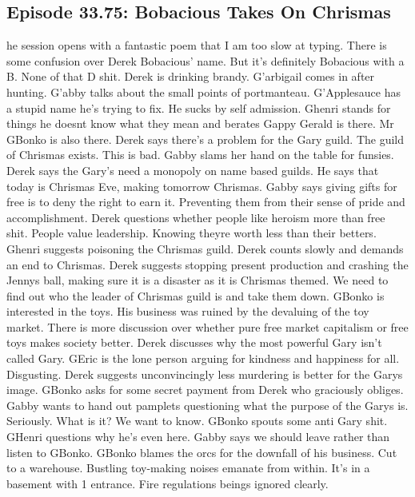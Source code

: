 \subsection{Episode 33.75: Bobacious Takes On Chrismas}
he session opens with a fantastic poem that I am too slow at typing.\medskip
There is some confusion over Derek Bobacious’ name. But it’s definitely Bobacious with a B. None of that D shit.\medskip
Derek is drinking brandy. G’arbigail comes in after hunting.\medskip
G’abby talks about the small points of portmanteau.\medskip
G’Applesauce has a stupid name he’s trying to fix. He sucks by self admission.\medskip
Ghenri stands for things he doesnt know what they mean and berates Gappy\medskip
Gerald is there.\medskip
Mr GBonko is also there.\medskip
Derek says there’s a problem for the Gary guild. The guild of Chrismas exists. This is bad.\medskip
Gabby slams her hand on the table for funsies.\medskip
Derek says the Gary’s need a monopoly on name based guilds. He says that today is Chrismas Eve, making tomorrow Chrismas.\medskip
Gabby says giving gifts for free is to deny the right to earn it. Preventing them from their sense of pride and accomplishment.\medskip
Derek questions whether people like heroism more than free shit. People value leadership. Knowing theyre worth less than their betters.\medskip
Ghenri suggests poisoning the Chrismas guild.\medskip
Derek counts slowly and demands an end to Chrismas.\medskip
Derek suggests stopping present production and crashing the Jennys ball, making sure it is a disaster as it is Chrismas themed. We need to find out who the leader of Chrismas guild is and take them down.\medskip
GBonko is interested in the toys. His business was ruined by the devaluing of the toy market.\medskip
There is more discussion over whether pure free market capitalism or free toys makes society better.\medskip
Derek discusses why the most powerful Gary isn’t called Gary.\medskip
GEric is the lone person arguing for kindness and happiness for all. Disgusting.\medskip
Derek suggests unconvincingly less murdering is better for the Garys image.\medskip
GBonko asks for some secret payment from Derek who graciously obliges.\medskip
Gabby wants to hand out pamplets questioning what the purpose of the Garys is. Seriously. What is it? We want to know.\medskip
GBonko spouts some anti Gary shit. GHenri questions why he’s even here. Gabby says we should leave rather than listen to GBonko.\medskip
GBonko blames the orcs for the downfall of his business.\medskip
Cut to a warehouse. Bustling toy-making noises emanate from within. It’s in a basement with 1 entrance. Fire regulations beings ignored clearly.\medskip
